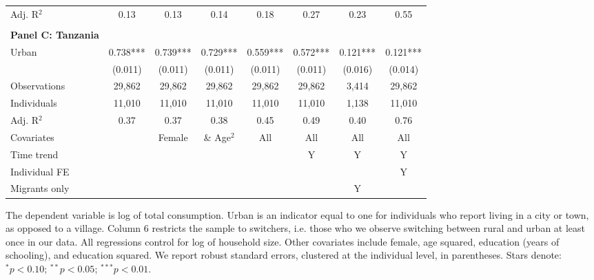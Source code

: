 \begin{table}[htbp]
\begin{threeparttable}
\begin{tabular}{l ccccccc}
Adj. R$^{2}$        &        0.13   &        0.13   &        0.14   &        0.18   &        0.27   &        0.23   &        0.55   \\
\cmidrule{2-8}
                    &               &               &               &               &               &               &               \\
\textbf{Panel C: Tanzania} \\
Urban               &       0.738***&       0.739***&       0.729***&       0.559***&       0.572***&       0.121***&       0.121***\\
                    &     (0.011)   &     (0.011)   &     (0.011)   &     (0.011)   &     (0.011)   &     (0.016)   &     (0.014)   \\
\addlinespace
Observations        &      29,862   &      29,862   &      29,862   &      29,862   &      29,862   &       3,414   &      29,862   \\
Individuals         &      11,010   &      11,010   &      11,010   &      11,010   &      11,010   &       1,138   &      11,010   \\
Adj. R$^{2}$        &        0.37   &        0.37   &        0.38   &        0.45   &        0.49   &        0.40   &        0.76   \\
\cmidrule{2-8} Covariates & & Female & \& Age$^2$ & All & All & All & All  \\ Time trend & & & & & Y & Y & Y  \\ Individual FE & & & & & & & Y  \\ Migrants only & & & & & & Y &  \\ \bottomrule \end{tabular} \begin{tablenotes} \footnotesize \item{The dependent variable is log of total consumption. Urban is an indicator equal to one for individuals who report living in a city or town, as opposed to a village. Column 6 restricts the sample to switchers, i.e. those who we observe switching between rural and urban at least once in our data. All regressions control for log of household size. Other covariates include female, age squared, education (years of schooling), and education squared. We report robust standard errors, clustered at the individual level, in parentheses. Stars denote: $^{*} p<0.10$; $^{**} p<0.05$; $^{***} p<0.01$.} \end{tablenotes} \end{threeparttable} \end{table}
